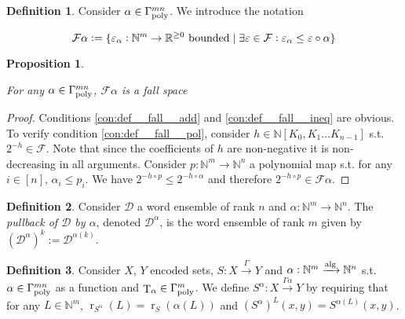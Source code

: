 \documentclass{article}
\numberwithin{equation}{section}
\theoremstyle{definition}
\newtheorem{definition}{Definition}[section]
\theoremstyle{plain}
\newtheorem{proposition}{Proposition}[section]
\DeclareMathOperator{\T}{T}
\DeclareMathOperator{\R}{r}
\newcommand{\Nats}{\mathbb{N}}
\newcommand{\Reals}{\mathbb{R}}
\newcommand{\NatPoly}{\Nats[K_0, K_1 \ldots K_{n-1}]}
\newcommand{\Dist}{\mathcal{D}}
\newcommand{\Fall}{\mathcal{F}}
\newcommand{\GammaPoly}{\Gamma_{\textnormal{poly}}}
\newcommand{\Alg}{\xrightarrow{\textnormal{alg}}}
\newcommand{\Scheme}{\xrightarrow{\Gamma}}
\begin{document}
\begin{samepage}
\begin{definition}

Consider ${\alpha \in \GammaPoly^{mn}}$. We introduce the notation

\begin{equation}
\label{eqn:tbd}
\Fall \alpha:=\{\varepsilon_\alpha: \Nats^m \rightarrow \Reals^{\geq 0} \textnormal{ bounded} \mid \exists \varepsilon \in \Fall: \varepsilon_\alpha \leq \varepsilon \circ \alpha\}
\end{equation}

\end{definition}
\end{samepage}

\begin{samepage}
\begin{proposition}
\label{prp:tbd}

For any ${\alpha \in \GammaPoly^{mn}}$, ${\Fall \alpha}$ is a fall space

\end{proposition}
\end{samepage}

\begin{proof}

Conditions \ref{con:def__fall__add} and \ref{con:def__fall__ineq} are obvious. To verify condition \ref{con:def__fall__pol}, consider ${h \in \NatPoly}$ s.t. ${2^{-h} \in \Fall}$. Note that since the coefficients of ${h}$ are non-negative it is non-decreasing in all arguments. Consider ${p: \Nats^m \rightarrow \Nats^n}$ a polynomial map s.t. for any ${i \in [n]}$, ${\alpha_i \leq p_i}$. We have ${2^{-h \circ p} \leq 2^{-h \circ \alpha}}$ and therefore ${2^{-h \circ p} \in \Fall \alpha}$.
%
\end{proof}

\begin{samepage}
\begin{definition}

Consider ${\Dist}$ a word ensemble of rank ${n}$ and ${\alpha: \Nats^m \rightarrow \Nats^n}$. The \emph{pullback of ${\Dist}$ by ${\alpha}$}, denoted ${\Dist^\alpha}$, is the word ensemble of rank ${m}$ given by ${(\Dist^\alpha)^k:=\Dist^{\alpha(k)}}$.

\end{definition}
\end{samepage}

\begin{samepage}
\begin{definition}

Consider ${X}$, ${Y}$ encoded sets, ${S: X \Scheme Y}$ and ${\alpha: \Nats^m \Alg \Nats^n}$ s.t. ${\alpha \in \GammaPoly^{mn}}$ as a function and ${\T_\alpha \in \GammaPoly^m}$. We define ${S^\alpha: X \xrightarrow{\Gamma \alpha} Y}$ by requiring that for any ${L \in \Nats^m}$, ${\R_{S^\alpha}(L)=\R_S(\alpha(L))}$ and ${(S^\alpha)^L(x,y)=S^{\alpha(L)}(x,y)}$.

\end{definition}
\end{samepage}
\end{document}
